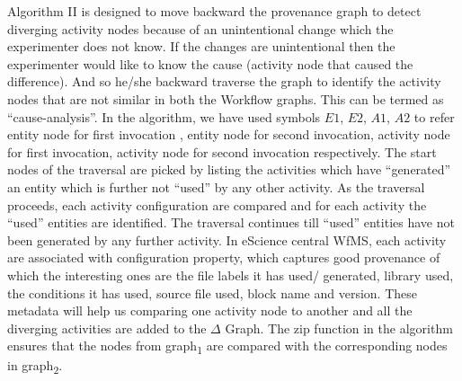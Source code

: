 \documentclass[10pt,conference,twocolumn]{IEEEtran}
\begin{document}
Algorithm II is designed to move backward the provenance graph to detect diverging activity nodes because of an unintentional change which the experimenter does not know. If the changes are unintentional then the experimenter would like to know the cause (activity node that caused the difference). And so he/she backward traverse the graph to identify the activity nodes that are not similar in both the Workflow graphs. This can be termed as \enquote{cause-analysis}. In the algorithm, we have used symbols $E1$, $E2$, $A1$, $A2$ to refer entity node for first invocation , entity node for second invocation, activity node for first invocation, activity node for second invocation respectively. The start nodes of the traversal are picked by listing the activities which have \enquote{generated} an entity which is further not \enquote{used} by any other activity. As the traversal proceeds, each activity configuration are compared and for each activity the \enquote{used} entities are identified. The traversal continues till \enquote{used} entities have not been generated by any further activity. In eScience central WfMS, each activity are associated with configuration property, which captures good provenance of which the interesting ones are the file labels it has used/ generated, library used, the conditions it has used, source file used, block name and version. These metadata will help us comparing one activity node to another and all the diverging activities are added to the $\Delta$ Graph. The zip function in the algorithm ensures that the nodes from graph\textsubscript{1} are compared with the corresponding nodes in graph\textsubscript{2}. 
\end{document}
